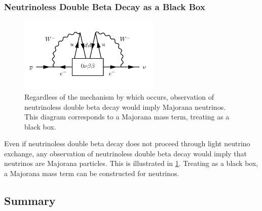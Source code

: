 \documentclass[herrin-thesis.tex]{subfiles}
\begin{document}
\subsubsection{Neutrinoless Double Beta Decay as a Black Box}

\begin{figure}[htp]
	\centering
	\includegraphics[width=0.6\textwidth]{./feynman_diagrams/zeronubetabeta_blackbox.pdf}
	\caption[Observation of \zeronu{} implies Majorana neutrinos]{Regardless of the mechanism by which \zeronu{} occurs, observation of neutrinoless double beta decay would imply Majorana neutrinos. This diagram corresponds to a Majorana mass term, treating \zeronu{} as a black box.}
	\label{fig:nu_blackbox}
\end{figure}

Even if neutrinoless double beta decay does not proceed through light neutrino exchange, any observation of neutrinoless double beta decay would imply that neutrinos are Majorana particles. This is illustrated in \cref{fig:nu_blackbox}. Treating \zeronu{} as a black box, a Majorana mass term can be constructed for neutrinos.

\subsection{Summary}
\end{document}
